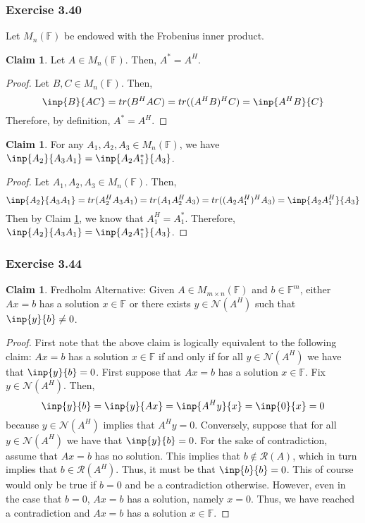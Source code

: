 \documentclass[letterpaper,12pt]{article}
\theoremstyle{definition}
\newtheorem{claim}[theorem]{Claim}
\begin{document}
\subsubsection*{Exercise 3.40}
Let $M_n (\mathbb{F})$ be endowed with the Frobenius inner product.
\begin{claim}\label{clm340}
	Let $A \in M_n (\mathbb{F})$. Then, $A^* = A^H$. 
\end{claim}
\begin{proof}
	Let $B, C \in M_n (\mathbb{F})$. Then, 
	\begin{equation}
	\inp{B}{AC} = tr(B^HAC) = tr((A^HB)^H C) = \inp{A^HB}{C}
	\end{equation}
	Therefore, by definition, $A^* = A^H$.
\end{proof}

\begin{claim}
	For any $A_1, A_2, A_3 \in M_n(\mathbb{F})$, we have $\inp{A_2}{A_3A_1} = \inp{A_2 A_1^*}{A_3}$.
\end{claim}
\begin{proof}
	Let $A_1, A_2, A_3 \in M_n(\mathbb{F})$. Then,
	\begin{equation}
		\inp{A_2}{A_3A_1} = tr(A_2^H A_3A_1) = tr(A_1 A_2^H A_3)= tr( (A_2 A_1^H)^H A_3) = \inp{A_2 A_1^H}{A_3}
	\end{equation}
	Then by Claim \ref{clm340}, we know that $A_1^H = A_1^*$. Therefore, $\inp{A_2}{A_3A_1} = \inp{A_2 A_1^*}{A_3}$.
\end{proof}

\subsubsection*{Exercise 3.44}
\begin{claim}
	Fredholm Alternative: Given $A \in M_{m\times n} (\mathbb{F})$ and $b \in \mathbb{F}^m$, either $Ax=b$ has a solution $x \in \mathbb{F}$ or there exists $y \in \mathscr{N}(A^H)$ such that $\inp{y}{b} \neq 0 $.
\end{claim}
\begin{proof}
	First note that the above claim is logically equivalent to the following claim: $Ax=b$ has a solution $x \in \mathbb{F}$ if and only if for all $y \in \mathscr{N}(A^H)$ we have that $\inp{y}{b} =0 $. First suppose that $Ax=b$ has a solution $x \in \mathbb{F}$. Fix $y \in \mathscr{N}(A^H)$.  Then, 
	\begin{equation}
	\inp{y}{b} = \inp{y}{Ax} = \inp{A^Hy}{x} = \inp{0}{x} = 0
	\end{equation}
	because $y \in \mathscr{N}(A^H)$ implies that $A^Hy = 0$. Conversely, suppose that for all $y \in \mathscr{N}(A^H)$ we have that $\inp{y}{b} =0 $. For the sake of contradiction, assume that $Ax=b$ has no solution. This implies that $b \not\in \mathscr{R}(A)$, which in turn implies that $b \in \mathscr{R}(A^H)$. Thus, it must be that $\inp{b}{b} = 0$.  This of course would only be true if $b=0$ and be a contradiction otherwise. However, even in the case that $b=0$, $Ax=b$ has a solution, namely $x=0$. Thus, we have reached a contradiction and $Ax=b$ has a solution $x \in \mathbb{F}$.
\end{proof}
\end{document}
